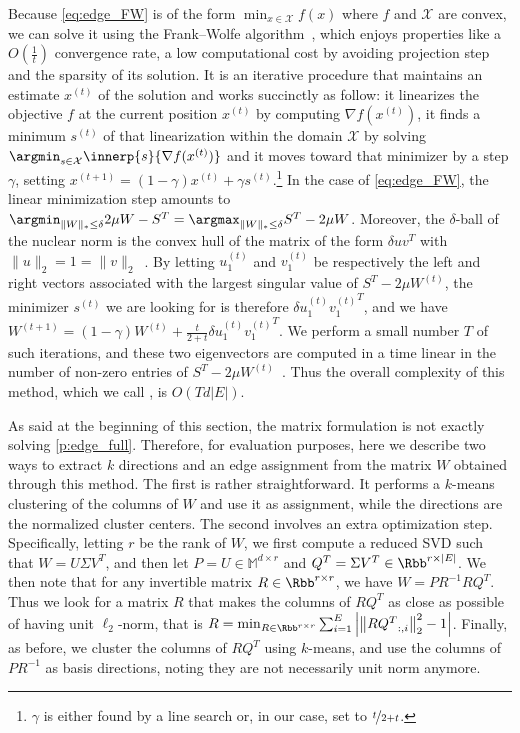 Because \eqref{eq:edge_FW} is of the form $\min_{x\in \mathcal{X}} f(x)$ where $f$ and $\mathcal{X}$
are convex, we can solve it using the Frank--Wolfe algorithm~\autocites{FrankWolfe56}{Jaggi2013a},
which enjoys properties like a $O(\frac{1}{t})$ convergence rate, a low computational cost by avoiding
projection step and the sparsity of its solution. It is an iterative procedure that maintains an estimate
$x^{(t)}$ of the solution and works succinctly as follow: it linearizes the objective $f$ at the
current position $x^{(t)}$ by computing $\nabla f(x^{(t)})$, it finds a minimum $s^{(t)}$ of that
linearization within the domain $\mathcal{X}$ by solving $\argmin_{s\in \mathcal{X}}
\innerp{s}{\nabla f(x^{(t)})}$ and it moves toward that minimizer by a step $\gamma$, setting
$x^{(t+1)} = (1-\gamma) x^{(t)} + \gamma s^{(t)}$.\footnote{$\gamma$ is either found by a line search or,
in our case, set to $\nicefrac{t}{2+t}$.} In the case of \eqref{eq:edge_FW}, the linear minimization step amounts
to $\argmin_{\|W\|_* \leq \delta} 2\mu W - S^T = \argmax_{\|W\|_* \leq \delta} S^T - 2\mu W$.
Moreover, the $\delta$-ball of the nuclear norm is the convex hull of the matrix of the form $\delta
u v^T$ with $\|u\|_2 = 1 = \|v\|_2$~\autocite{Jaggi2013a}. By letting $u_1^{(t)}$ and $v_1^{(t)}$ be
respectively the left and right vectors associated with the largest singular value of $S^T - 2\mu
W^{(t)}$, the minimizer $s^{(t)}$ we are looking for is therefore $\delta u_1^{(t)} {v_1^{(t)}}^T$,
and we have $W^{(t+1)} = (1-\gamma) W^{(t)} + \frac{t}{2+t} \delta u_1^{(t)} {v_1^{(t)}}^T$. We
perform a small number $T$ of such iterations, and these two eigenvectors are computed in a
time linear in the number of non-zero entries of $S^T - 2\mu W^{(t)}$~\autocite{topEigenvalue92}.
Thus the overall complexity of this method, which we call \fwa{}, is $O(Td|E|)$.

As said at the beginning of this section, the matrix formulation is not exactly solving
\autoref{p:edge_full}. Therefore, for evaluation purposes, here we describe two ways to extract $k$
directions and an edge assignment from the matrix $W$ obtained through this \fwa{} method. The first
is rather straightforward. It performs a $k$-means clustering of the columns of $W$ and use it as
assignment, while the directions are the normalized cluster centers. The second involves an extra
optimization step. Specifically, letting $r$ be the rank of $W$, we first compute a reduced SVD such
that $W = U \Sigma V^T$, and then let $P = U \in \mathbb{M}^{d\times r}$ and $Q^T = \Sigma V^T \in \Rbb^{r
\times |E|}$. We then note that for any invertible matrix $R \in \Rbb^{r \times r}$, we have $W =
PR^{-1} RQ^T$. Thus we look for a matrix $R$ that makes the columns of $RQ^T$ as close as possible
of having unit $\ell_2$-norm, that is $R = \min_{R \in \Rbb^{r \times r}} \sum_{i=1}^E \left| \left\|
{RQ^T}_{:,i} \right\|_2^2 - 1 \right|$. Finally, as before,  we cluster the columns of $RQ^T$ using
$k$-means, and use the columns of $PR^{-1}$ as basis directions, noting they are not
necessarily unit norm anymore.

